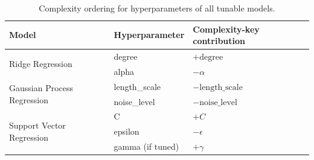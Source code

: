 \begin{table}[t]
	\centering
	\caption{Complexity ordering for hyperparameters of all tunable models.}
	\label{tab:complexity-key-hyperparameters}
	\begin{tabular}{lll}
		\toprule
		Model & Hyperparameter   & Complexity-key contribution \\
		\midrule
		\multirow{2}{*}{Ridge Regression}
		      & degree           & $+\text{degree}$            \\
		      & alpha            & $-\alpha$                   \\
		\midrule
		\multirow{2}{*}{Gaussian Process Regression}
		      & length\_scale    & $-\text{length\_scale}$     \\
		      & noise\_level     & $-\text{noise\_level}$      \\
		\midrule
		\multirow{3}{*}{Support Vector Regression}
		      & C                & $+C$                        \\
		      & epsilon          & $-\epsilon$                 \\
		      & gamma (if tuned) & $+\gamma$                   \\
		\bottomrule
	\end{tabular}
\end{table}
